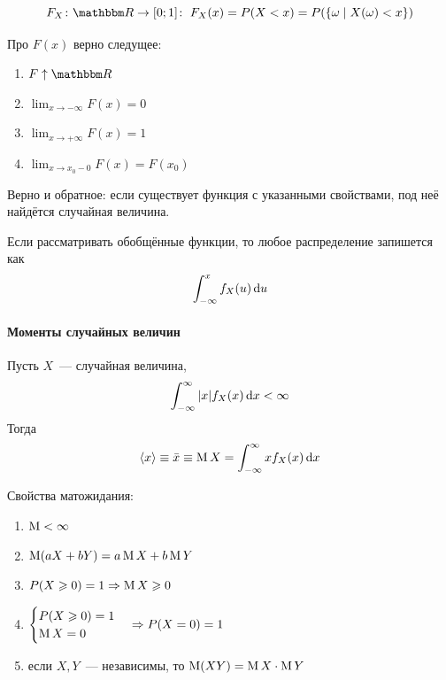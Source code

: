 \documentclass[12pt,hardcopy]{../../../notes}
\begin{document}
\begin{defn}\label{defn:prob::randscal::distrfun}
  \[
    F_X\colon \R\to [0;1] \colon\; F_X(x) = P(X < x) = P(\{\omega \mid X(\omega) < x \})
  \]
\end{defn}

\begin{prop}\label{prop:prob::randscal::distrfun}
  Про $F(x)$ верно следущее:
  \begin{enumerate}
    \item $F\displaystyle\uparrow \R$
    \item $\displaystyle\lim_{x\to -\infty}F(x) = 0$
    \item $\displaystyle\lim_{x\to +\infty}F(x) = 1$
    \item $\displaystyle\lim_{x\to x_0-0}F(x) = F(x_0)$
  \end{enumerate}
\end{prop}

\begin{prop}\label{prop:prob::randscal::inv}
  Верно и обратное: если существует функция с  указанными свойствами, под неё найдётся случайная
  величина. 
\end{prop}

\begin{rem*}\label{rem*:prob::randscal::delta}
  Если рассматривать обобщённые функции, то любое распределение запишется как
  \[
    \int_{-\infty}^x f_X(u)\,\mathrm{d} u
  \]
\end{rem*}
\paragraph{Моменты случайных величин}
\label{par:prob::moments}

\begin{defn}\label{defn:prob::moments::exp}
  Пусть $X$~--- случайная величина, \[
    \int_{-\infty}^{\infty} |x| f_X(x)\, \mathrm{d} x < \infty 
  \]
  Тогда 
  \[
    \langle x \rangle \equiv \bar x \equiv \operatorname{M} X = \int_{-\infty}^{\infty} x f_X(x)\, \mathrm{d} x
  \]
\end{defn}

\begin{prop}\label{prop:prob::moments::expprop}
  Свойства матожидания:
  \begin{enumerate}
    \item $\operatorname{M} < \infty$
    \item $\operatorname{M}(a X + b Y) = a\operatorname{M} X + b\operatorname{M} Y$
    \item $P(X \geqslant 0) = 1 \Rightarrow \operatorname{M} X \geqslant 0 $
    \item $\begin{cases}
      P(X \geqslant 0) = 1 \\
      \operatorname{M} X = 0
    \end{cases}\Rightarrow P(X= 0) =1  $
    \item если $X,Y$~--- независимы, то $\operatorname{M} (XY) = \operatorname{M} X \cdot \operatorname{M} Y$
  \end{enumerate}
\end{prop}
\end{document}
